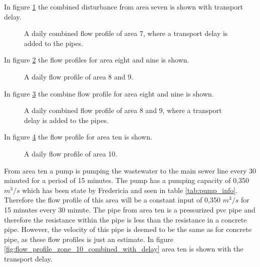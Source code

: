 In figure \ref{fig:flow_profile_zone_7_combined_with_delay} the combined disturbance from area seven is shown with transport delay. 

\begin{figure}[H]
\centering

\caption{A daily combined flow profile of area 7, where a transport delay is added to the pipes.}
\label{fig:flow_profile_zone_7_combined_with_delay}
\end{figure} 

In figure \ref{fig:APP_flow_profile_zone8_9} the flow profiles for area eight and nine is shown. 

\begin{figure}[H]
\centering

\caption{A daily flow profile of area 8 and 9.}
\label{fig:APP_flow_profile_zone8_9}
\end{figure} 

In figure \ref{fig:flow_profile_zone_8_9_combined_with_delay} the combine flow profile for area eight and nine is shown. 

\begin{figure}[H]
\centering

\caption{A daily combined flow profile of area 8 and 9, where a transport delay is added to the pipes.}
\label{fig:flow_profile_zone_8_9_combined_with_delay}
\end{figure} 

In figure \ref{fig:APP_flow_profile_zone10} the flow profile for area ten is shown. 

\begin{figure}[H]
\centering

\caption{A daily flow profile of area 10.}
\label{fig:APP_flow_profile_zone10}
\end{figure} 

From area ten a pump is pumping the wastewater to the main sewer line every 30 minuted for a period of 15 minutes. The pump has a pumping capacity of 0,350 $m^3/s$ which has been state by Fredericia and seen in table \ref{tab:pump_info}. Therefore the flow profile of this area will be a constant input of 0,350 $m^3/s$ for 15 minutes every 30 minute. The pipe from area ten is a pressurized pvc pipe and therefore the resistance within the pipe is less than the resistance in a concrete pipe. However, the velocity of this pipe is deemed to be the same as for concrete pipe, as these flow profiles is just an estimate. In figure \ref{fig:flow_profile_zone_10_combined_with_delay} area ten is shown with the transport delay.   

